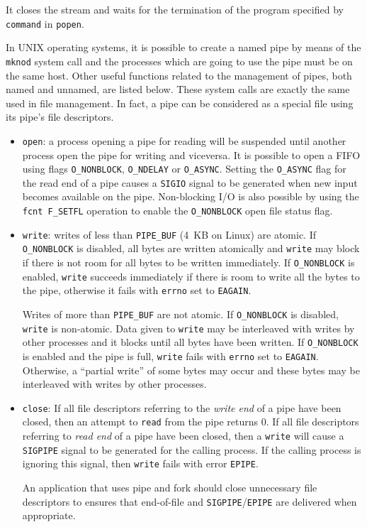 It closes the stream and waits for the termination of the program specified by \texttt{command} in \texttt{popen}.

\medskip
In UNIX operating systems, it is possible to create a named pipe by means of the \texttt{mknod} system call and the processes which are going to use the pipe must be on the same host. Other useful functions related to the management of pipes, both named and unnamed, are listed below. These system calls are exactly the same used in file management. In fact, a pipe can be considered as a special file using its pipe’s file descriptors.
\begin{itemize}
\item \texttt{open}: a process opening a pipe for reading will be suspended until another process open the pipe for writing and viceversa. It is possible to open a FIFO using flags \texttt{O\_NONBLOCK}, \texttt{O\_NDELAY} or \texttt{O\_ASYNC}. Setting the \texttt{O\_ASYNC} flag for the read end of a pipe causes a \texttt{SIGIO} signal to be generated when new input becomes available on the pipe. Non-blocking I/O is also possible by using the \texttt{fcnt F\_SETFL} operation to enable the \texttt{O\_NONBLOCK} open file status flag.
\item \texttt{write}: writes of less than \texttt{PIPE\_BUF} (4~KB on Linux) are atomic. If \texttt{O\_NONBLOCK} is disabled, all bytes are written atomically and \texttt{write} may block if there is not room for all bytes to be written immediately. If \texttt{O\_NONBLOCK} is enabled, \texttt{write} succeeds immediately if there is room to write all the bytes to the pipe, otherwise it fails with \texttt{errno} set to \texttt{EAGAIN}.

Writes of more than \texttt{PIPE\_BUF} are not atomic. If \texttt{O\_NONBLOCK} is disabled, \texttt{write} is non-atomic. Data given to \texttt{write} may be interleaved with writes by other processes and it blocks until all bytes have been written. If \texttt{O\_NONBLOCK} is enabled and the pipe is full, \texttt{write} fails with \texttt{errno} set to \texttt{EAGAIN}. Otherwise, a ``partial write'' of some bytes may occur and these bytes may be interleaved with writes by other processes.
\item \texttt{close}: If all file descriptors referring to the \emph{write end} of a pipe have been closed, then an attempt to \texttt{read} from the pipe returns 0. If all file descriptors referring to \emph{read end} of a pipe have been closed, then a \texttt{write} will cause a \texttt{SIGPIPE} signal to be generated for the calling process. If the calling process is ignoring this signal, then \texttt{write} fails with error \texttt{EPIPE}.

An application that uses pipe and fork should close unnecessary file descriptors to ensures that end-of-file and \texttt{SIGPIPE}/\texttt{EPIPE} are delivered when appropriate.
\end{itemize}

